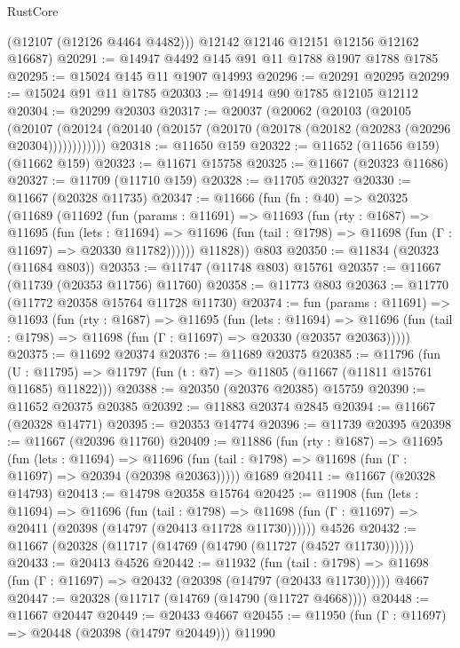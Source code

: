 \begin{lexlean}{RustCore}
\begin{coremodule}
        (@12107 (@12126 @4464 @4482)))
      @12142
      @12146
      @12151
      @12156
      @12162
      @16687)
@20291 := @14947 @4492 @145 @91 @11 @1788 @1907 @1788 @1785
@20295 := @15024 @145 @11 @1907 @14993
@20296 := @20291 @20295
@20299 := @15024 @91 @11 @1785
@20303 := @14914 @90 @1785 @12105 @12112
@20304 := @20299 @20303
@20317 := @20037
    (@20062
      (@20103
        (@20105
          (@20107 (@20124 (@20140 (@20157 (@20170 (@20178 (@20182 (@20283 (@20296 @20304))))))))))))
@20318 := @11650 @159
@20322 := @11652 (@11656 @159) (@11662 @159)
@20323 := @11671 @15758
@20325 := @11667 (@20323 @11686)
@20327 := @11709 (@11710 @159)
@20328 := @11705 @20327
@20330 := @11667 (@20328 @11735)
@20347 := @11666
    (fun (fn : @40) =>
    @20325
      (@11689
        (@11692
          (fun (params : @11691) =>
          @11693
            (fun (rty : @1687) =>
            @11695
              (fun (lets : @11694) =>
              @11696 (fun (tail : @1798) => @11698 (fun (Γ : @11697) => @20330 @11782))))))
        @11828))
    @803
@20350 := @11834 (@20323 (@11684 @803))
@20353 := @11747 (@11748 @803) @15761
@20357 := @11667 (@11739 (@20353 @11756) @11760)
@20358 := @11773 @803
@20363 := @11770 (@11772 @20358 @15764 @11728 @11730)
@20374 := fun (params : @11691) =>
  @11693
    (fun (rty : @1687) =>
    @11695
      (fun (lets : @11694) =>
      @11696 (fun (tail : @1798) => @11698 (fun (Γ : @11697) => @20330 (@20357 @20363)))))
@20375 := @11692 @20374
@20376 := @11689 @20375
@20385 := @11796
    (fun (U : @11795) => @11797 (fun (t : @7) => @11805 (@11667 (@11811 @15761 @11685) @11822)))
@20388 := @20350 (@20376 @20385) @15759
@20390 := @11652 @20375 @20385
@20392 := @11883 @20374 @2845
@20394 := @11667 (@20328 @14771)
@20395 := @20353 @14774
@20396 := @11739 @20395
@20398 := @11667 (@20396 @11760)
@20409 := @11886
    (fun (rty : @1687) =>
    @11695
      (fun (lets : @11694) =>
      @11696 (fun (tail : @1798) => @11698 (fun (Γ : @11697) => @20394 (@20398 @20363)))))
    @1689
@20411 := @11667 (@20328 @14793)
@20413 := @14798 @20358 @15764
@20425 := @11908
    (fun (lets : @11694) =>
    @11696
      (fun (tail : @1798) =>
      @11698 (fun (Γ : @11697) => @20411 (@20398 (@14797 (@20413 @11728 @11730))))))
    @4526
@20432 := @11667 (@20328 (@11717 (@14769 (@14790 (@11727 (@4527 @11730))))))
@20433 := @20413 @4526
@20442 := @11932
    (fun (tail : @1798) => @11698 (fun (Γ : @11697) => @20432 (@20398 (@14797 (@20433 @11730)))))
    @4667
@20447 := @20328 (@11717 (@14769 (@14790 (@11727 @4668))))
@20448 := @11667 @20447
@20449 := @20433 @4667
@20455 := @11950 (fun (Γ : @11697) => @20448 (@20398 (@14797 @20449))) @11990

\end{coremodule}
\end{lexlean}
